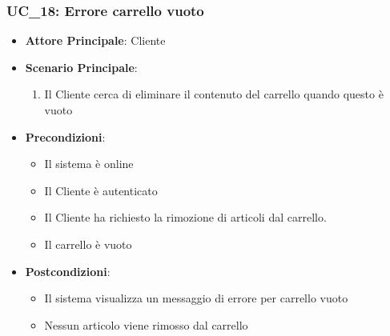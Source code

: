 \subsubsection{UC\_18: Errore carrello vuoto}
\label{uc_18}

\begin{itemize}
    \item \textbf{Attore Principale}: Cliente
	 \item \textbf{Scenario Principale}:
    \begin{enumerate}
        \item Il Cliente cerca di eliminare il contenuto del carrello quando questo è vuoto
    \end{enumerate}
   \item \textbf{Precondizioni}:
	\begin{itemize}
		\item Il sistema è online
		\item Il Cliente è autenticato
		\item Il Cliente ha richiesto la rimozione di articoli dal carrello.
		\item Il carrello è vuoto
    \end{itemize}
	\item \textbf{Postcondizioni}:
	\begin{itemize}
		\item Il sistema visualizza un messaggio di errore per carrello vuoto
		\item Nessun articolo viene rimosso dal carrello
	\end{itemize}
\end{itemize}